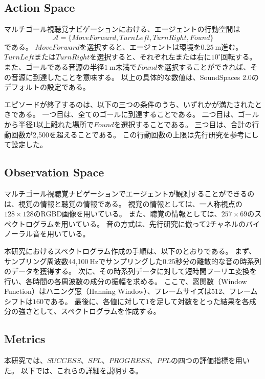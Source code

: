 \subsection{Action Space}

マルチゴール視聴覚ナビゲーションにおける、エージェントの行動空間は
\[ 
\mathcal{A} = \{MoveForward, TurnLeft, TurnRight, Found\} \label{eq:action_space}
\]
である。
$MoveForward$を選択すると、エージェントは環境を$0.25\ \mathrm{m}$進む。
$TurnLeft$または$TurnRight$を選択すると、それぞれ左または右に$10^\circ$回転する。
また、ゴールである音源の半径$1\ \mathrm{m}$未満で$Found$を選択することができれば、その音源に到達したことを意味する。
以上の具体的な数値は、SoundSpaces 2.0のデフォルトの設定である。

エピソードが終了するのは、以下の三つの条件のうち、いずれかが満たされたときである。
一つ目は、全てのゴールに到達することである。
二つ目は、ゴールから半径1以上離れた場所で$Found$を選択することである。
三つ目は、合計の行動回数が2,500を超えることである。
この行動回数の上限は先行研究\cite{wani2020multion}を参考にして設定した。

\subsection{Observation Space}

マルチゴール視聴覚ナビゲーションでエージェントが観測することができるのは、視覚の情報と聴覚の情報である。
視覚の情報としては、一人称視点の$128 \times 128$のRGBD画像を用いている。
また、聴覚の情報としては、$257 \times 69$のスペクトログラムを用いている。
音の方式は、先行研究に倣って2チャネルのバイノーラル音を用いている。

本研究におけるスペクトログラム作成の手順は、以下のとおりである。
まず、サンプリング周波数44,100$\ \mathrm{Hz}$でサンプリングした$0.25$秒分の離散的な音の時系列のデータを獲得する。
次に、その時系列データに対して短時間フーリエ変換を行い、各時間の各周波数の成分の振幅を求める。
ここで、窓関数（Window Function）はハニング窓（Hanning Window）、フレームサイズは$512$、フレームシフトは$160$である。
最後に、各値に対して$1$を足して対数をとった結果を各成分の強さとして、スペクトログラムを作成する。


\subsection{Metrics}


本研究では、$SUCCESS$、$SPL$、$PROGRESS$、$PPL$の四つの評価指標を用いた。
以下では、これらの詳細を説明する。

